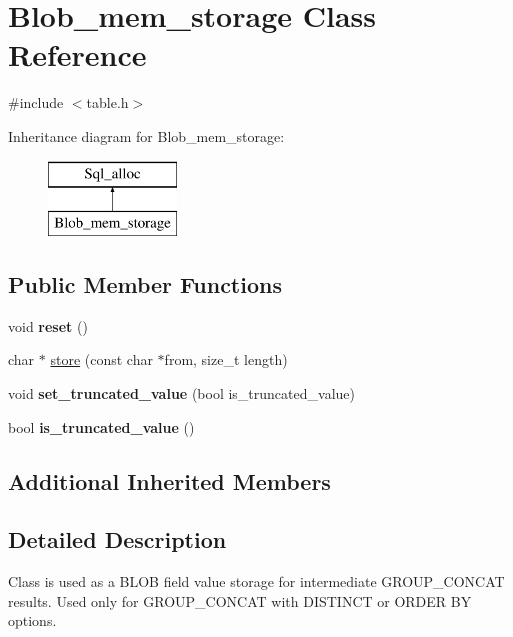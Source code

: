 \hypertarget{classBlob__mem__storage}{}\section{Blob\+\_\+mem\+\_\+storage Class Reference}
\label{classBlob__mem__storage}


{\ttfamily \#include $<$table.\+h$>$}

Inheritance diagram for Blob\+\_\+mem\+\_\+storage\+:\begin{figure}[H]
\begin{center}
\leavevmode
\includegraphics[height=2.000000cm]{classBlob__mem__storage}
\end{center}
\end{figure}
\subsection*{Public Member Functions}
\begin{DoxyCompactItemize}
\item 
\mbox{\label{classBlob__mem__storage_a4d4e85f7dffec98b2f33c42d2862ff59}} 
void {\bfseries reset} ()
\item 
char $\ast$ \mbox{\hyperlink{classBlob__mem__storage_a0226d57def9b7f4565b6a2fa00093137}{store}} (const char $\ast$from, size\+\_\+t length)
\item 
\mbox{\label{classBlob__mem__storage_a5073479606f5f4f6b063238415d2ff71}} 
void {\bfseries set\+\_\+truncated\+\_\+value} (bool is\+\_\+truncated\+\_\+value)
\item 
\mbox{\label{classBlob__mem__storage_a833203ec681086d5f4c412931b92b8c0}} 
bool {\bfseries is\+\_\+truncated\+\_\+value} ()
\end{DoxyCompactItemize}
\subsection*{Additional Inherited Members}


\subsection{Detailed Description}
Class is used as a B\+L\+OB field value storage for intermediate G\+R\+O\+U\+P\+\_\+\+C\+O\+N\+C\+AT results. Used only for G\+R\+O\+U\+P\+\_\+\+C\+O\+N\+C\+AT with D\+I\+S\+T\+I\+N\+CT or O\+R\+D\+ER BY options. 

